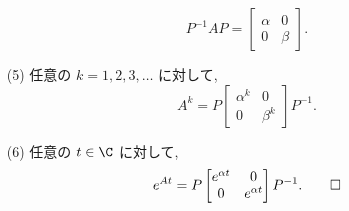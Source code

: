 \documentclass[12pt,twoside]{jarticle}
\begin{document}
\begin{question}[10点]
\begin{enumerate}
\begin{equation*}
      P^{-1} A P = \begin{bmatrix}\alpha & 0\\0 & \beta\end{bmatrix}.
    \end{equation*}
  \item[(5)] 任意の $k=1,2,3,\ldots$ に対して,
    \begin{equation*}
      A^k = P \begin{bmatrix}\alpha^k & 0\\0 & \beta^k\end{bmatrix} P^{-1}.
    \end{equation*}
  \item[(6)] 任意の $t\in\C$ に対して,
    \begin{equation*}
      e^{At} =
      P
      \begin{bmatrix}
        e^{\alpha t} & 0 \\
        0 & e^{\alpha t} \\
      \end{bmatrix}
      P^{-1}.
    \qed
    \end{equation*}
  \end{enumerate}
\end{question}

\end{document}
